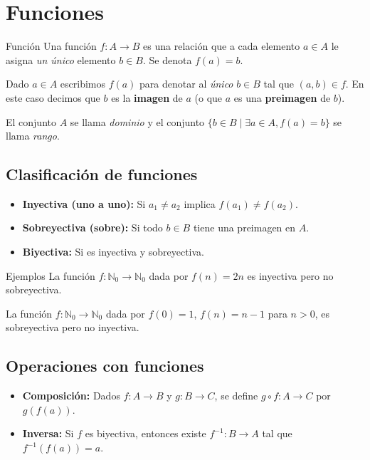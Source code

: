 \section{Funciones}

\begin{definitionblock}{Funci\'on}
Una funci\'on $f: A \to B$ es una relaci\'on que a cada elemento $a \in A$ le asigna \emph{un \'unico} elemento $b \in B$. Se denota $f(a) = b$.
\end{definitionblock}

\noindent Dado $a \in A$ escribimos \textbf{$f(a)$} para denotar al \emph{único} $b \in B$ tal que $(a,b) \in f$. En este caso decimos que $b$ es la \textbf{imagen} de $a$ (o que $a$ es una \textbf{preimagen} de $b$).


\noindent El conjunto $A$ se llama \emph{dominio} y el conjunto $\{b \in B \mid \exists a \in A, f(a) = b\}$ se llama \emph{rango}.

\subsection{Clasificaci\'on de funciones}

\begin{itemize}
  \item \textbf{Inyectiva (uno a uno):} Si $a_1 \neq a_2$ implica $f(a_1) \neq f(a_2)$.
  \item \textbf{Sobreyectiva (sobre):} Si todo $b \in B$ tiene una preimagen en $A$.
  \item \textbf{Biyectiva:} Si es inyectiva y sobreyectiva.
\end{itemize}

\begin{exampleblock}{Ejemplos}
La funci\'on $f:\mathbb{N}_0 \to \mathbb{N}_0$ dada por $f(n) = 2n$ es inyectiva pero no sobreyectiva.

La funci\'on $f:\mathbb{N}_0 \to \mathbb{N}_0$ dada por $f(0) = 1$, $f(n) = n-1$ para $n>0$, es sobreyectiva pero no inyectiva.
\end{exampleblock}

\subsection{Operaciones con funciones}

\begin{itemize}
  \item \textbf{Composici\'on:} Dados $f: A \to B$ y $g: B \to C$, se define $g \circ f: A \to C$ por $g(f(a))$.
  \item \textbf{Inversa:} Si $f$ es biyectiva, entonces existe $f^{-1}: B \to A$ tal que $f^{-1}(f(a)) = a$.
\end{itemize}


